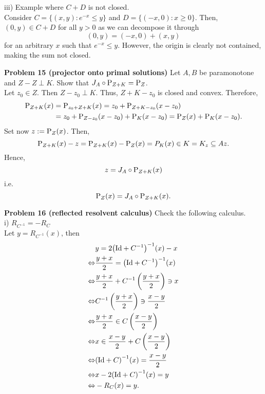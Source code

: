 \documentclass{scrartcl}
\newcommand{\sub}{\subseteq}
\theoremstyle{plain}
\theoremstyle{remark}
\newcommand{\Id}{\textup{Id}}
\renewcommand{\P}{\textup{P}}
\begin{document}
iii) Example where $C+D$ is not closed.\\
Consider $C=\{(x,y) : e^{-x} \le y\}$ and $D = \{(-x,0) : x \ge 0\}$. Then, $(0, y) \in C+D$ for all $y>0$ as we can decompose it through
\begin{equation}
  (0, y) = (-x, 0) + (x, y)
\end{equation}
for an arbitrary $x$ such that $e^{-x} \le y$. However, the origin is clearly not contained, making the sum not closed.

\textbf{Problem 15 (projector onto primal solutions)} Let $A,B$ be paramonotone and $Z-Z \perp K$. Show that $J_A \circ \P_{Z+K} = \P_Z$.\\
Let $z_0 \in Z$. Then $Z-z_0 \perp K$. Thus, $Z+K -z_0$ is closed and convex.
Therefore,
\begin{equation}
  \begin{aligned}
    \P_{Z+K}(x) &= \P_{z_0+ Z+K}(x) = z_0 + \P_{Z+K-z_0}(x-z_0) \\
    &= z_0 + \P_{Z-z_0}(x-z_0) + \P_{K}(x-z_0) = \P_Z(x) + \P_K(x-z_0).
  \end{aligned}
\end{equation}
Set now $z := \P_Z(x)$.
Then,
\begin{equation}
  \P_{Z+K}(x) - z = \P_{Z+K}(x) - \P_Z(x) = P_K(x) \in K = K_z \sub Az.
\end{equation}
Hence,
\begin{equation}
  z = J_A \circ \P_{Z+K}(x)
\end{equation}
i.e.
\begin{equation}
  \P_Z(x) = J_A \circ \P_{Z+K}(x).
\end{equation}


\textbf{Problem 16 (reflected resolvent calculus)} Check the following calculus. \\
i) $R_{C^{-1}} = - R_{C}$ \\
Let $y = R_{C^{-1}}(x)$, then
\begin{equation}
  \begin{aligned}
    &y = 2{\left(\Id + C^{-1}\right)}^{-1}(x) - x \\
    \Leftrightarrow& \frac{y+x}{2} = {\left(\Id + C^{-1}\right)}^{-1}(x) \\
    \Leftrightarrow& \frac{y+x}{2} + C^{-1}\left(\frac{y+x}{2}\right) \ni x \\
    \Leftrightarrow& C^{-1}\left(\frac{y+x}{2}\right) \ni \frac{x-y}{2} \\
    \Leftrightarrow& \frac{y+x}{2} \in  C \left( \frac{x-y}{2} \right) \\
    \Leftrightarrow& x \in \frac{x-y}{2} + C \left( \frac{x-y}{2} \right) \\
    \Leftrightarrow& {(\Id + C)}^{-1}(x) = \frac{x-y}{2} \\
    \Leftrightarrow& x-2{(\Id + C)}^{-1}(x) = y \\
    \Leftrightarrow& -R_{C}(x) = y.
  \end{aligned}
\end{equation}
\end{document}
